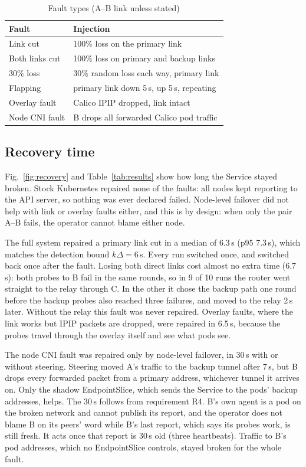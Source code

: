 \documentclass[conference,compsoc]{IEEEtran}
\begin{document}
\begin{table}[t]
\centering
\caption{Fault types (A--B link unless stated)}
\label{tab:faults}
\footnotesize
\begin{tabular}{@{}ll@{}}
\toprule
Fault & Injection \\
\midrule
Link cut & 100\% loss on the primary link \\
Both links cut & 100\% loss on primary and backup links \\
30\% loss & 30\% random loss each way, primary link \\
Flapping & primary link down 5\,s, up 5\,s, repeating \\
Overlay fault & Calico IPIP dropped, link intact \\
Node CNI fault & B drops all forwarded Calico pod traffic \\
\bottomrule
\end{tabular}
\end{table}

\subsection{Recovery time}
Fig.~\ref{fig:recovery} and Table~\ref{tab:results} show how long the Service stayed
broken. Stock Kubernetes repaired none of the faults: all nodes kept reporting
to the API server, so nothing was ever declared failed. Node-level failover did not
help with link or overlay faults either, and this is by design: when only the pair
A--B fails, the operator cannot blame either node.

The full system repaired a primary link cut in a median of 6.3\,s (p95 7.3\,s), which
matches the detection bound $k\Delta=6$\,s. Every run switched once, and switched back
once after the fault. Losing both direct links cost almost no extra time (6.7\,s):
both probes to B fail in the same rounds, so in 9 of 10 runs the router went straight
to the relay through C. In the other it chose the backup path one round before the
backup probes also reached three failures, and moved to the relay 2\,s later. Without
the relay this fault was never repaired. Overlay faults, where the link works
but IPIP packets are dropped, were repaired in 6.5\,s, because the probes travel
through the overlay itself and see what pods see.

The node CNI fault was repaired only by node-level failover, in 30\,s with or without
steering. Steering moved A's traffic to the backup tunnel after 7\,s, but B drops every
forwarded packet from a primary address, whichever tunnel it arrives on. Only the
shadow EndpointSlice, which sends the Service to the pods' backup addresses, helps.
The 30\,s follows from requirement R4. B's own agent is a pod on the broken network and
cannot publish its report, and the operator does not blame B on its peers' word while
B's last report, which says its probes work, is still fresh. It acts once that report
is 30\,s old (three heartbeats). Traffic to B's pod addresses, which no EndpointSlice
controls, stayed broken for the whole fault.
\end{document}
